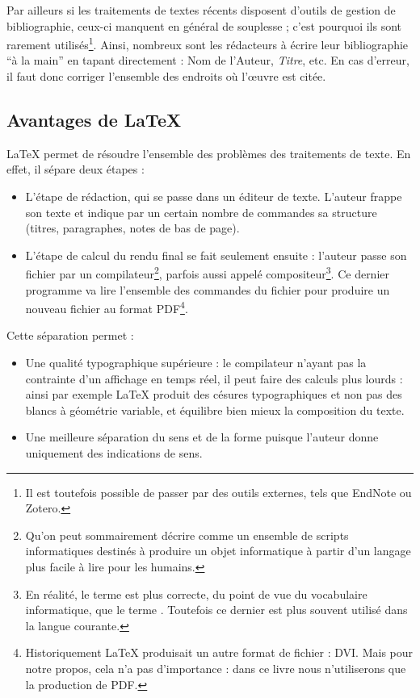 Par ailleurs si les traitements de textes récents disposent d'outils de gestion de bibliographie, ceux-ci manquent en général de souplesse ; c'est pourquoi ils sont rarement utilisés\footnote{Il est toutefois possible de passer par des outils externes, tels que EndNote ou Zotero.}. Ainsi, nombreux sont les rédacteurs à écrire  leur bibliographie \enquote{à la main} en tapant directement : Nom de l'Auteur, \emph{Titre}, etc. En cas d'erreur, il faut donc corriger l'ensemble des endroits où l'œuvre est citée.

\subsection{Avantages de \LaTeX{}}

\LaTeX{} permet de résoudre l'ensemble des problèmes des traitements de texte. En effet, il sépare deux étapes : 

\begin{itemize}
\item L'étape de rédaction, qui se passe dans un éditeur de texte. L'auteur frappe son texte et indique par un certain nombre de commandes sa structure (titres, paragraphes, notes de bas de page).
\item L'étape de calcul du rendu final se fait seulement  ensuite : l'auteur  passe son fichier par un compilateur\footnote{Qu'on peut sommairement décrire comme un ensemble de scripts informatiques destinés à produire un objet informatique à partir d'un langage plus facile à lire pour les humains.}, parfois aussi appelé compositeur\footnote{En réalité, le terme  est plus correcte, du point de vue du vocabulaire informatique, que le terme . Toutefois ce dernier est plus souvent utilisé dans la langue courante.}. Ce dernier programme va lire l'ensemble des commandes du fichier pour produire un nouveau fichier au format PDF\footnote{Historiquement \LaTeX{} produisait un autre format de fichier : DVI. Mais pour notre propos, cela n'a pas d'importance : dans ce livre nous n'utiliserons que la production de PDF.}.
\end{itemize}

Cette séparation permet :
\begin{itemize}
\item Une qualité typographique supérieure :  le compilateur n'ayant pas la contrainte d'un affichage en temps réel, il peut faire des calculs plus lourds : ainsi par exemple \LaTeX{} produit des césures typographiques et non pas des blancs à géométrie variable, et équilibre bien mieux la composition du texte.
\item Une meilleure séparation du sens et de la forme puisque l'auteur donne uniquement des indications de sens.
\end{itemize}


